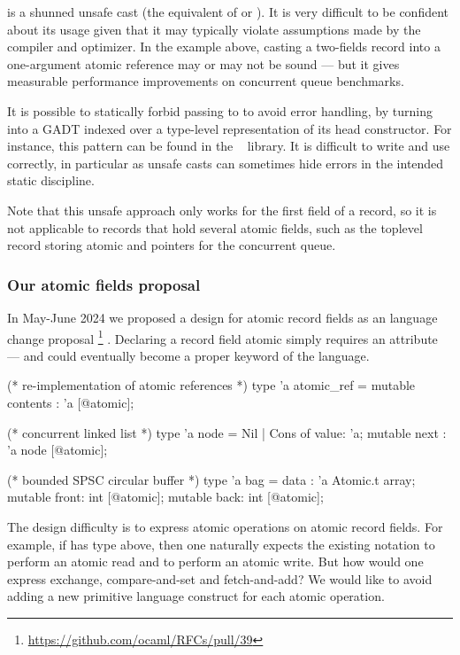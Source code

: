  is a shunned unsafe cast (the \OCaml equivalent of  or ).
It is very difficult to be confident about its usage given that it may typically violate assumptions made by the \OCaml compiler and optimizer.
In the example above, casting a two-fields record into a one-argument atomic reference may or may not be sound --- but it gives measurable performance improvements on concurrent queue benchmarks.

It is possible to statically forbid passing  to  to avoid error handling, by turning  into a GADT indexed over a type-level representation of its head constructor.
For instance, this pattern can be found in the \Kcas~\citep*{kcas} library.
It is difficult to write and use correctly, in particular as unsafe casts can sometimes hide errors in the intended static discipline.

Note that this unsafe approach only works for the first field of a record, so it is not applicable to records that hold several atomic fields, such as the toplevel record storing atomic  and  pointers for the concurrent queue.

\subsubsection{Our atomic fields proposal}

In May-June 2024 we proposed a design for atomic record fields as an \OCaml language change proposal%
\footnote{
\url{https://github.com/ocaml/RFCs/pull/39}
}%
.
Declaring a record field atomic simply requires an \ocamlinline{[@atomic]} attribute --- and could eventually become a proper keyword of the language.
\begin{ocamlcode}
(* re-implementation of atomic references *)
type 'a atomic_ref = { mutable contents : 'a [@atomic]; }

(* concurrent linked list *)
type 'a node = Nil | Cons of { value: 'a; mutable next : 'a node [@atomic]; }

(* bounded SPSC circular buffer *)
type 'a bag = { data : 'a Atomic.t array;
                mutable front: int [@atomic];
                mutable back: int [@atomic]; }
\end{ocamlcode}

The design difficulty is to express atomic operations on atomic record fields.
For example, if  has type  above, then one naturally expects the existing notation  to perform an atomic read and  to perform an atomic write.
But how would one express exchange, compare-and-set and fetch-and-add?
We would like to avoid adding a new primitive language construct for each atomic operation.

